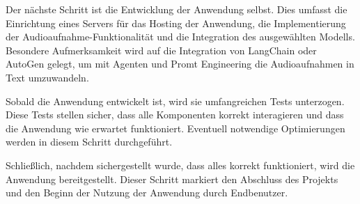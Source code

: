 \documentclass[12pt,a4paper,parskip=full]{scrartcl}
\begin{document}
Der nächste Schritt ist die Entwicklung der Anwendung selbst. 
Dies umfasst die Einrichtung eines Servers für das Hosting der Anwendung, die Implementierung der Audioaufnahme-Funktionalität und die Integration des ausgewählten Modells. 
Besondere Aufmerksamkeit wird auf die Integration von LangChain \cite{langchain_agents_nodate} oder AutoGen \cite{microsoft_getting_nodate} gelegt, um mit Agenten und Promt Engineering die Audioaufnahmen in Text umzuwandeln.

Sobald die Anwendung entwickelt ist, wird sie umfangreichen Tests unterzogen.
Diese Tests stellen sicher, dass alle Komponenten korrekt interagieren und dass die Anwendung wie erwartet funktioniert. Eventuell notwendige Optimierungen werden in diesem Schritt durchgeführt.

Schließlich, nachdem sichergestellt wurde, dass alles korrekt funktioniert, wird die Anwendung bereitgestellt.
Dieser Schritt markiert den Abschluss des Projekts und den Beginn der Nutzung der Anwendung durch Endbenutzer.

\printbibliography
\end{document}
